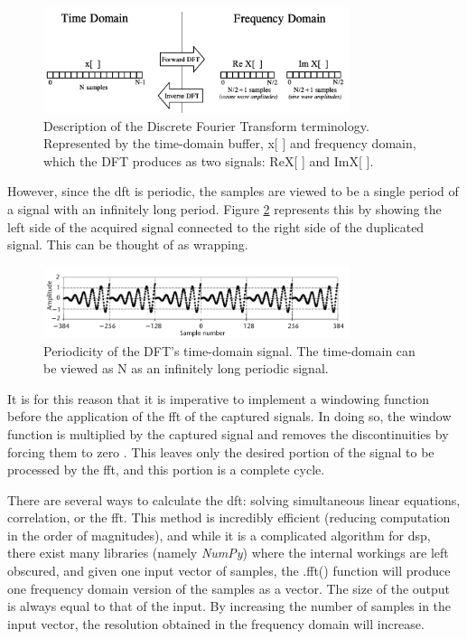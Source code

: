 \documentclass[class=report,11pt,crop=false]{standalone}
\begin{document}
\begin{figure}[h]
    \centering
    \includegraphics[width=0.8\textwidth]{Images/diagrams/DFT-time.png}
    \caption{Description of the Discrete Fourier Transform terminology. Represented by the time-domain buffer, x[ ] and frequency domain, which the DFT produces as two signals: ReX[ ] and ImX[ ]. \cite{engineers-dsp}}
    \label{fig:dft-time}
\end{figure}


However, since the \gls{dft} is periodic, the samples are viewed to be a single period of a signal with an infinitely long period. Figure \ref{fig:dft} represents this by showing the left side of the acquired signal connected to the right side of the duplicated signal. This can be thought of as wrapping.

\begin{figure}[h]
    \centering
    \includegraphics[width=0.8\textwidth]{Images/diagrams/dft.png}
    \caption{Periodicity of the DFT’s time-domain signal. The time-domain can be viewed as N
as an infinitely long periodic signal. \cite{engineers-dsp}}
    \label{fig:dft}
\end{figure}

It is for this reason that it is imperative to implement a windowing function before the application of the \gls{fft} of the captured signals. In doing so, the window function is multiplied by the captured signal and removes the discontinuities by forcing them to zero \cite{window}. This leaves only the desired portion of the signal to be processed by the \gls{fft}, and this portion is a complete cycle.

There are several ways to calculate the \gls{dft}: solving simultaneous linear equations, correlation, or the \gls{fft}. This method is incredibly efficient (reducing computation in the order of magnitudes), and while it is a complicated algorithm for \gls{dsp}, there exist many libraries (namely \emph{NumPy}) where the internal workings are left obscured, and given one input vector of samples, the .fft() function will produce one frequency domain version of the samples as a vector. The size of the output is always equal to that of the input. By increasing the number of samples in the input vector, the resolution obtained in the frequency domain will increase. 
\end{document}
